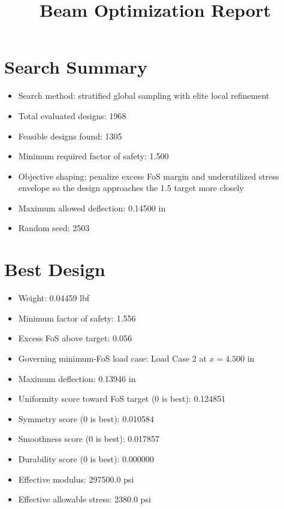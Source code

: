 \documentclass[11pt]{article}
\title{Beam Optimization Report}
\date{}
\begin{document}
\maketitle

\section*{Search Summary}
\begin{itemize}
\item Search method: stratified global sampling with elite local refinement
\item Total evaluated designs: 1968
\item Feasible designs found: 1305
\item Minimum required factor of safety: 1.500
\item Objective shaping: penalize excess FoS margin and underutilized stress envelope so the design approaches the 1.5 target more closely
\item Maximum allowed deflection: 0.14500 in
\item Random seed: 2503
\end{itemize}

\section*{Best Design}
\begin{itemize}
\item Weight: 0.04459 lbf
\item Minimum factor of safety: 1.556
\item Excess FoS above target: 0.056
\item Governing minimum-FoS load case: Load Case 2 at $x=4.500$ in
\item Maximum deflection: 0.13946 in
\item Uniformity score toward FoS target (0 is best): 0.124851
\item Symmetry score (0 is best): 0.010584
\item Smoothness score (0 is best): 0.017857
\item Durability score (0 is best): 0.000000
\item Effective modulus: 297500.0 psi
\item Effective allowable stress: 2380.0 psi
\end{itemize}
\end{document}
